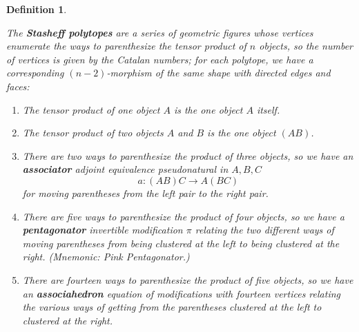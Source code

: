\documentclass[12pt,twoside,openright]{report}
\newtheorem{defn}{Definition}
\newcommand{\maps}{\colon}
\begin{document}
\begin{defn}
\begin{itemize}
The {\bf Stasheff polytopes} \cite{Stasheff} are a series of geometric figures whose vertices enumerate the ways to parenthesize the tensor product of $n$ objects, so the number of vertices is given by the Catalan numbers; for each polytope, we have a corresponding $(n-2)$-morphism of the same shape with directed edges and faces:
  \begin{enumerate}
    \item The tensor product of one object $A$ is the one object $A$ itself.
    \item The tensor product of two objects $A$ and $B$ is the one object $(A B)$.
    \item There are two ways to parenthesize the product of three objects, so we have an {\bf associator} adjoint equivalence pseudonatural in $A,B,C$
        \[ a\maps (A B) C \rightarrow A (B C) \]
      for moving parentheses from the left pair to the right pair.
    \item There are five ways to parenthesize the product of four objects, so we have a {\bf pentagonator} invertible modification $\pi$ relating the two different ways of moving parentheses from being clustered at the left to being clustered at the right.  (Mnemonic: Pink Pentagonator.)
      \begin{center}
      \end{center}
    \item There are fourteen ways to parenthesize the product of five objects, so we have an {\bf associahedron} equation of modifications with fourteen vertices relating the various ways of getting from the parentheses clustered at the left to clustered at the right.
      \begin{center}

\end{center}
\end{enumerate}
\end{itemize}
\end{defn}
\end{document}
